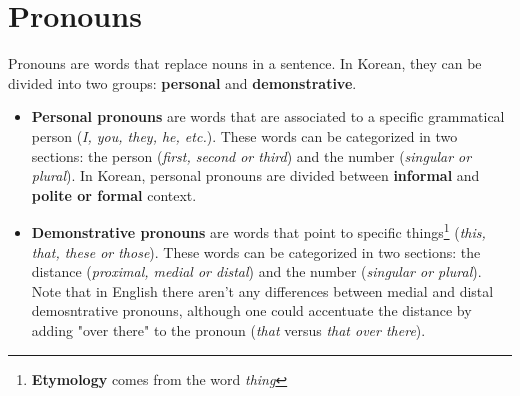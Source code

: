 \section{Pronouns}
Pronouns are words that replace nouns in a sentence. In Korean, they can be divided into two groups: \textbf{personal} and \textbf{demonstrative}.

\begin{itemize}
    \item \textbf{Personal pronouns} are words that are associated to a specific grammatical person (\textit{I, you, they, he, etc.}). These words can be categorized in two sections: the person (\textit{first, second or third}) and the number (\textit{singular or plural}). In Korean, personal pronouns are divided between \textbf{informal} and \textbf{polite or formal} context.
    
    \item \textbf{Demonstrative pronouns} are words that point to specific things\footnote{\textbf{Etymology}  comes from the word \textit{thing}} (\textit{this, that, these or those}). These words can be categorized in two sections: the distance (\textit{proximal, medial or distal}) and the number (\textit{singular or plural}). Note that in English there aren't any differences between medial and distal demosntrative pronouns, although one could accentuate the distance by adding "over there" to the pronoun (\textit{that} versus \textit{that over there}).
\end{itemize}


